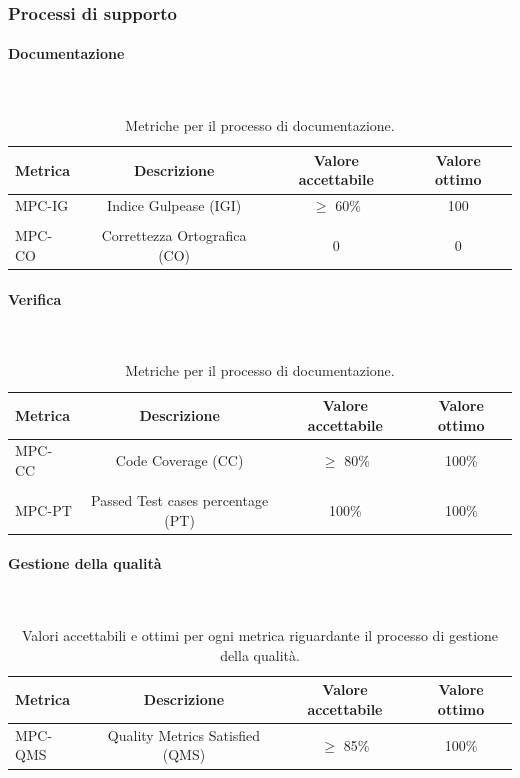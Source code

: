 \documentclass[8pt]{article}
\newcommand{\subsubsubsection}[1]{\paragraph{#1}\mbox{}\\}
\begin{document}
\subsubsection{Processi di supporto}
\subsubsubsection{Documentazione}
\begin{table}[h]	
	\centering
	\begin{tabular}{lccc}
		\toprule
		\textbf{Metrica}& \textbf{Descrizione} & \textbf{Valore accettabile} & \textbf{Valore ottimo} \\
		\midrule
		MPC-IG & Indice Gulpease (IGI) & $\geq$ 60\% & 100 \\\\
		MPC-CO & Correttezza Ortografica (CO) & 0 & 0 \\
		\bottomrule
	\end{tabular}
	\caption{Metriche per il processo di documentazione.}
	\label{table:Tabella delle metriche per il processo di documentazione}
\end{table}
\subsubsubsection{Verifica}
\begin{table}[h]	
	\centering
	\begin{tabular}{lccc}
		\toprule
		\textbf{Metrica}& \textbf{Descrizione} & \textbf{Valore accettabile} & \textbf{Valore ottimo} \\
		\midrule
		MPC-CC & Code Coverage (CC) & $\geq$ 80\% & 100\% \\\\
		MPC-PT & Passed Test cases percentage (PT) & 100\% & 100\% \\
		\bottomrule
	\end{tabular}
	\caption{Metriche per il processo di documentazione.}
	\label{table:Tabella delle metriche per il processo di documentazione}
\end{table}
\subsubsubsection{Gestione della qualità}
\begin{table}[H]	
	\centering
	\begin{tabular}{lccc}
		\toprule
		\textbf{Metrica}& \textbf{Descrizione} & \textbf{Valore accettabile} & \textbf{Valore ottimo} \\
		\midrule
		MPC-QMS & Quality Metrics Satisfied (QMS) & $\geq$ 85\%& 100\%\\
		\bottomrule
	\end{tabular}
	\caption{Valori accettabili e ottimi per ogni metrica riguardante il processo di gestione della qualità.}
	\label{table:Valori accettabili e ottimi per ogni metrica riguardante il processo di gestione della qualità.}
\end{table}
\clearpage
\end{document}

